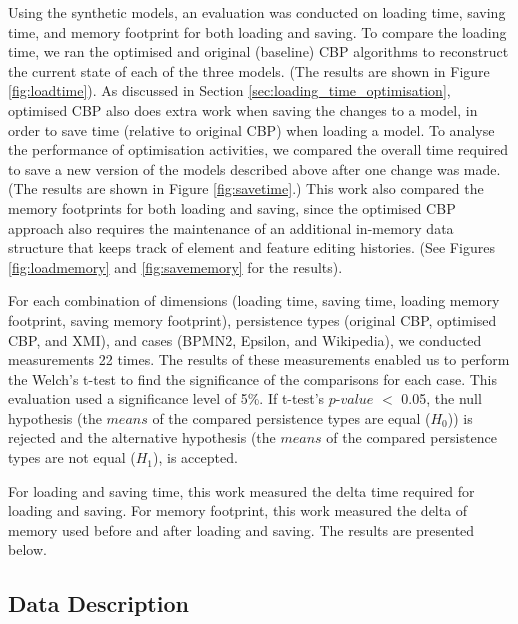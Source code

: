 {  Using the synthetic models, an evaluation was conducted on loading time, saving time, and memory footprint for both loading and saving. To compare the loading time, we ran the optimised and original (baseline) CBP algorithms to reconstruct the current state of each of the three models. (The results are shown in Figure \ref{fig:loadtime}). As discussed in Section \ref{sec:loading_time_optimisation}, optimised CBP also does extra work when saving the changes to a model, in order to save time (relative to original CBP) when loading a model. To analyse the performance of optimisation activities, we compared the overall time required to save a new version of the models described above after one change was made. (The results are shown in Figure \ref{fig:savetime}.) This work also compared the memory footprints for both loading and saving, since the optimised CBP approach also requires the maintenance of an additional in-memory data structure that keeps track of element and feature editing histories. (See Figures \ref{fig:loadmemory} and \ref{fig:savememory} for the results).
  
  For each combination of dimensions (loading time, saving time, loading memory footprint, saving memory footprint), persistence types (original CBP, optimised CBP, and XMI), and cases (BPMN2, Epsilon, and Wikipedia), we conducted measurements 22 times. The results of these measurements enabled us to perform the Welch’s t-test \cite{welch1947ttest} to find the significance of the comparisons for each case. This evaluation used a significance level of 5\%. If t-test’s $p$-$value$ $<$ 0.05, the null hypothesis (the $means$ of the compared persistence types are equal ($H_0$)) is rejected and the alternative hypothesis (the $means$ of the compared persistence types are not equal ($H_1$), is accepted.
  
  For loading and saving time, this work measured the delta time required for loading and saving. For memory footprint, this work measured the delta of memory used before and after loading and saving. The results are presented below.
  
  \subsection{Data Description}
  \label{subsec:data_description}
  
}
